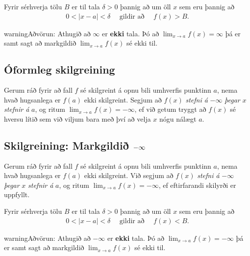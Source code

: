 \documentclass[b5paper,11pt,icelandic]{sphinxmanual}
\begin{document}
Fyrir sérhverja tölu \(B\) er til tala \(\delta>0\) þannig
að um öll \(x\) sem eru þannig að
\begin{equation*}
\begin{split}0 < |x-a| <\delta \quad  \text{ gildir að } \quad f(x) > B.\end{split}
\end{equation*}
\begin{notice}{warning}{Aðvörun:}
Athugið að \(\infty\) er \textbf{ekki} tala. Þó að
\(\lim_{x\rightarrow a} f(x)=\infty\) þá er samt sagt að markgildið
\(\lim_{x\rightarrow a} f(x)\) sé ekki til.
\end{notice}


\subsection{Óformleg skilgreining}
\label{kafli02:id9}
Gerum ráð fyrir að fall \(f\) sé skilgreint á opnu bili umhverfis
punktinn \(a\), nema hvað hugsanlega er \(f(a)\) ekki
skilgreint. Segjum að \(f(x)\) \emph{stefni á} \(-\infty\) \emph{þegar}
\(x\) \emph{stefnir á} \(a\), og ritum
\(\lim_{x\rightarrow a} f(x)=-\infty\), ef við getum tryggt að
\(f(x)\) sé hversu lítið sem við viljum bara með því að velja
\(x\) nógu nálægt \(a\).


\subsection{Skilgreining: Markgildið \protect\(-\infty\protect\)}
\label{kafli02:id10}
Gerum ráð fyrir að fall \(f\) sé skilgreint á opnu bili umhverfis
punktinn \(a\), nema hvað hugsanlega er \(f(a)\) ekki
skilgreint. Við segjum að \(f(x)\) \emph{stefni á} \(-\infty\)
\emph{þegar} \(x\) \emph{stefnir á} \(a\), og ritum
\(\lim_{x\rightarrow a} f(x)=-\infty\), ef eftirfarandi skilyrði er
uppfyllt.

Fyrir sérhverja tölu \(B\) er til tala \(\delta>0\) þannig
að um öll \(x\) sem eru þannig að
\begin{equation*}
\begin{split}0 < |x-a| < \delta \quad \text{ gildir að } \quad f(x)<B.\end{split}
\end{equation*}
\begin{notice}{warning}{Aðvörun:}
Athugið að \(-\infty\) er \textbf{ekki} tala. Þó að
\(\lim_{x\rightarrow a} f(x)=-\infty\) þá er samt sagt að markgildið
\(\lim_{x\rightarrow a} f(x)\) sé ekki til.
\end{notice}
\end{document}
